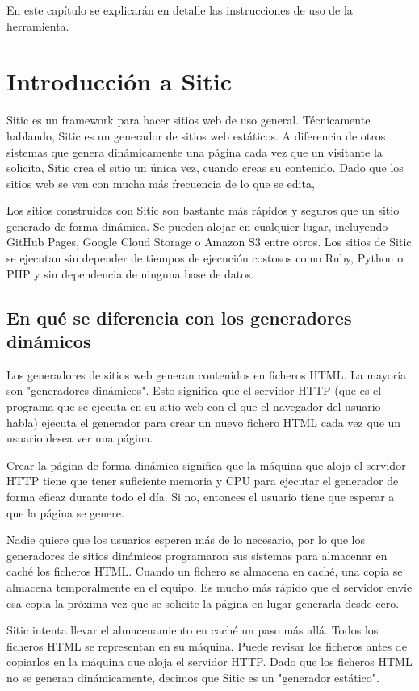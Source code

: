 En este capítulo se explicarán en detalle las instrucciones de uso de la herramienta.

\section{Introducción a Sitic}

Sitic es un framework para hacer sitios web de uso general. Técnicamente hablando, Sitic es un generador de sitios web estáticos.
A diferencia de otros sistemas que genera dinámicamente una página cada vez que un visitante la solicita, Sitic crea el sitio
un única vez, 
cuando creas su contenido. Dado que los sitios web se ven con mucha más frecuencia de lo que se edita,

Los sitios construidos con Sitic son bastante más rápidos y seguros que un sitio generado de forma dinámica.
Se pueden alojar en cualquier lugar, incluyendo GitHub Pages, Google Cloud Storage o Amazon
S3 entre otros. Los sitios de Sitic se ejecutan sin depender de tiempos de ejecución costosos como Ruby, Python
o PHP y sin dependencia de ninguna base de datos.

\subsection{En qué se diferencia con los generadores dinámicos}

Los generadores de sitios web generan contenidos en ficheros HTML. La mayoría son "generadores dinámicos".
Esto significa que el servidor HTTP (que es el programa que se ejecuta en su sitio web con el que el navegador del
usuario habla) ejecuta el generador para crear un nuevo fichero HTML cada vez que un usuario desea ver una página.

Crear la página de forma dinámica significa que la máquina que aloja el servidor HTTP tiene que tener suficiente
memoria y CPU para ejecutar el generador de forma eficaz durante todo el día. Si no, entonces el usuario tiene que
esperar a que la página se genere.

Nadie quiere que los usuarios esperen más de lo necesario, por lo que los generadores de sitios dinámicos programaron
sus sistemas para almacenar en caché los ficheros HTML. Cuando un fichero se almacena en caché, una copia se
almacena temporalmente en el equipo. Es mucho más rápido que el servidor envíe esa copia la próxima vez que
se solicite la página en lugar generarla desde cero.

Sitic intenta llevar el almacenamiento en caché un paso más allá. Todos los ficheros HTML se representan en su máquina.
Puede revisar los ficheros antes de copiarlos en la máquina que aloja el servidor HTTP. Dado que los ficheros HTML
no se generan dinámicamente, decimos que Sitic es un "generador estático".

